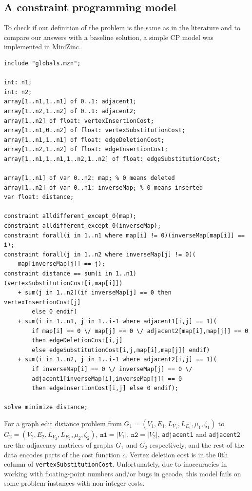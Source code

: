 \documentclass{article}
\theoremstyle{definition}
\begin{document}
\subsection{A constraint programming model}
\label{sec:cp}
To check if our definition of the problem is the same as in the literature and to compare our answers with a baseline solution, a simple CP model was implemented in MiniZinc.
\begin{lstlisting}
include "globals.mzn";

int: n1;
int: n2;
array[1..n1,1..n1] of 0..1: adjacent1;
array[1..n2,1..n2] of 0..1: adjacent2;
array[1..n2] of float: vertexInsertionCost;
array[1..n1,0..n2] of float: vertexSubstitutionCost;
array[1..n1,1..n1] of float: edgeDeletionCost;
array[1..n2,1..n2] of float: edgeInsertionCost;
array[1..n1,1..n1,1..n2,1..n2] of float: edgeSubstitutionCost;

array[1..n1] of var 0..n2: map; % 0 means deleted
array[1..n2] of var 0..n1: inverseMap; % 0 means inserted
var float: distance;

constraint alldifferent_except_0(map);
constraint alldifferent_except_0(inverseMap);
constraint forall(i in 1..n1 where map[i] != 0)(inverseMap[map[i]] == i);
constraint forall(j in 1..n2 where inverseMap[j] != 0)(
    map[inverseMap[j]] == j);
constraint distance == sum(i in 1..n1)(vertexSubstitutionCost[i,map[i]])
    + sum(j in 1..n2)(if inverseMap[j] == 0 then vertexInsertionCost[j]
        else 0 endif)
    + sum(i in 1..n1, j in 1..i-1 where adjacent1[i,j] == 1)(
        if map[i] == 0 \/ map[j] == 0 \/ adjacent2[map[i],map[j]] == 0
        then edgeDeletionCost[i,j]
        else edgeSubstitutionCost[i,j,map[i],map[j]] endif)
    + sum(i in 1..n2, j in 1..i-1 where adjacent2[i,j] == 1)(
        if inverseMap[i] == 0 \/ inverseMap[j] == 0 \/
        adjacent1[inverseMap[i],inverseMap[j]] == 0
        then edgeInsertionCost[i,j] else 0 endif);

solve minimize distance;
\end{lstlisting}
For a graph edit distance problem from $G_1 = (V_1, E_1, L_{V_1}, L_{E_1}, \mu_1, \zeta_1)$ to $G_2 = (V_2, E_2, L_{V_2}, L_{E_2}, \mu_2, \zeta_2)$, $\texttt{n1} = |V_1|$, $\texttt{n2} = |V_2|$, \texttt{adjacent1} and \texttt{adjacent2} are the adjacency matrices of graphs $G_1$ and $G_2$ respectively, and the rest of the data encodes parts of the cost function $c$. Vertex deletion cost is in the 0th column of \texttt{vertexSubstitutionCost}. Unfortunately, due to inaccuracies in working with floating-point numbers and/or bugs in gecode, this model fails on some problem instances with non-integer costs.
\end{document}
